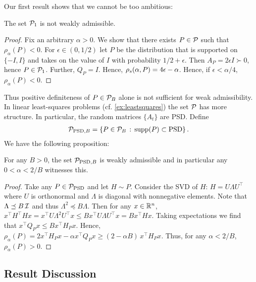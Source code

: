 \documentclass{article}
\begin{document}
Our first result shows that we cannot be too ambitious:
\begin{proposition}\label{notwad}
The set $\P_1$ is not weakly admissible.
\end{proposition}
\begin{proof}
Fix an arbitrary $\alpha>0$. We show that there exists $P\in \P$ such that $\rho_\alpha(P)<0$.
For $\epsilon \in (0,1/2)$ let $P$ be the distribution that is supported on $\{-I,I\}$ and takes on the value of $I$ with probability $1/2+\epsilon$. Then $A_P = 2\epsilon I \succ 0$, hence $P\in \P_1$. Further, $Q_P = I$.
Hence, $\rhos{P} = 4\epsilon-\alpha$. Hence, if $\epsilon<\alpha/4$, $\rho_\alpha(P)<0$.
\end{proof}
Thus  positive definiteness of $P\in \P_B$ alone is not sufficient for weak admissibility.
In linear least-squares problems (cf. \cref{ex:leastsquares}) the set $\P$ has more structure.
In particular, the random matrices $\{A_t\}$ are PSD. 
Define
\begin{align*}
\P_{\text{PSD},B} = \{ P \in \P_B \,:\,  \supp(P)\subset \text{PSD} \}\,.
\end{align*}
We have the following proposition:
\begin{proposition}
For any $B>0$, the set $\P_{\text{PSD},B}$ is weakly admissible
and in particular any $0<\alpha < 2/B$ witnesses this.
\end{proposition}
\begin{proof}
Take any $P\in \P_{\text{PSD}}$ and let $H\sim P$.
Consider the SVD of $H$: $H = U \Lambda U^\top$ where $U$ is orthonormal and $\Lambda$ is diagonal with
nonnegative elements. Note that $\Lambda \preceq B\, \I$ and thus $\Lambda^2 \preceq B \Lambda$.
Then for any $x\in \R^n$, $x^\top H^\top H x = x^\top U \Lambda^2 U^\top x \le B x^\top U \Lambda U^\top x = B x^\top H x$.
Taking expectations we find that $x^\top Q_P x \le B x^\top H_P x$.
Hence, $\rho_\alpha(P) = 2 x^\top H_P x - \alpha x^\top Q_P x \ge (2- \alpha B ) \,x^\top H_P x $.
Thus, for any $\alpha<2/B$, $\rho_\alpha(P)>0$.
\end{proof}
\subsection{Result Discussion}
\end{document}
